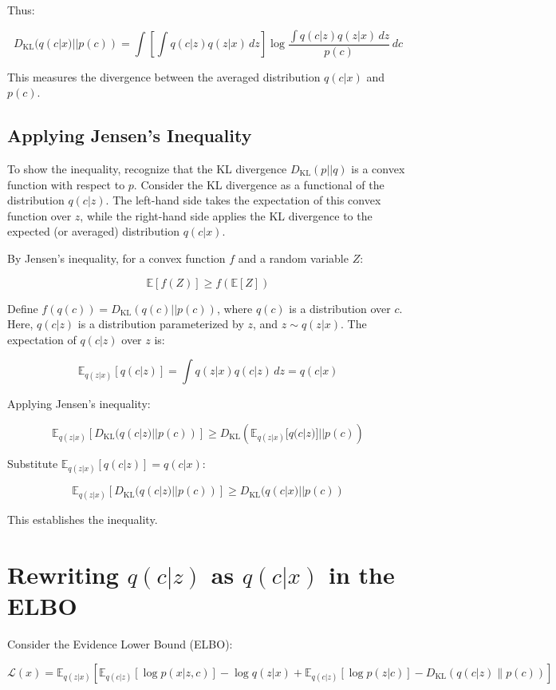 \documentclass[12pt]{article}
\numberwithin{equation}{section}
\begin{document}
Thus:

\[
D_{\text{KL}}(q(c|x) || p(c)) = \int \left[ \int q(c|z) q(z|x) \, dz \right] \log \frac{\int q(c|z) q(z|x) \, dz}{p(c)} \, dc
\]

This measures the divergence between the averaged distribution \( q(c|x) \) and \( p(c) \).

\subsection{Applying Jensen's Inequality}

To show the inequality, recognize that the KL divergence \( D_{\text{KL}}(p || q) \) is a convex function with respect to \( p \). Consider the KL divergence as a functional of the distribution \( q(c|z) \). The left-hand side takes the expectation of this convex function over \( z \), while the right-hand side applies the KL divergence to the expected (or averaged) distribution \( q(c|x) \).

By Jensen's inequality, for a convex function \( f \) and a random variable \( Z \):

\[
\mathbb{E}[f(Z)] \geq f(\mathbb{E}[Z])
\]

Define \( f(q(c)) = D_{\text{KL}}(q(c) || p(c)) \), where \( q(c) \) is a distribution over \( c \). Here, \( q(c|z) \) is a distribution parameterized by \( z \), and \( z \sim q(z|x) \). The expectation of \( q(c|z) \) over \( z \) is:

\[
\mathbb{E}_{q(z|x)} [q(c|z)] = \int q(z|x) q(c|z) \, dz = q(c|x)
\]

Applying Jensen's inequality:

\[
\mathbb{E}_{q(z|x)} \left[ D_{\text{KL}}(q(c|z) || p(c)) \right] \geq D_{\text{KL}} \left( \mathbb{E}_{q(z|x)} [q(c|z)] || p(c) \right)
\]

Substitute \( \mathbb{E}_{q(z|x)} [q(c|z)] = q(c|x) \):

\[
\mathbb{E}_{q(z|x)} \left[ D_{\text{KL}}(q(c|z) || p(c)) \right] \geq D_{\text{KL}}(q(c|x) || p(c))
\]

This establishes the inequality.

\section{Rewriting \( q(c|z) \) as \( q(c|x) \) in the ELBO}

Consider the Evidence Lower Bound (ELBO):

\[
\mathcal{L}(x) = \mathbb{E}_{q(z | x)} \left[ \mathbb{E}_{q(c | z)} \left[ \log p(x | z, c) \right] - \log q(z | x) + \mathbb{E}_{q(c | z)} \left[ \log p(z | c) \right] - D_{\text{KL}}(q(c | z) \| p(c)) \right]
\]
\end{document}
